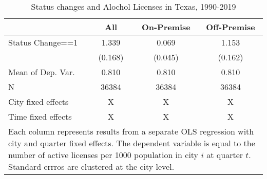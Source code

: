 \begin{table}
\centering
\caption{Status changes and Alochol Licenses in Texas, 1990-2019}
\centering
\begin{tabular}[t]{lccc}
\toprule
  & All & On-Premise & Off-Premise\\
\midrule
Status Change==1 & \num{1.339} & \num{0.069} & \num{1.153}\\
 & (\num{0.168}) & (\num{0.045}) & (\num{0.162})\\
\midrule
Mean of Dep. Var. & 0.810 & 0.810 & 0.810\\
N & \num{36384} & \num{36384} & \num{36384}\\
City fixed effects & X & X & X\\
Time fixed effects & X & X & X\\
\bottomrule
\multicolumn{4}{l}{\rule{0pt}{1em}Each column represents results from a separate OLS regression with city and quarter fixed effects. The dependent variable is equal to the number of active licenses per 1000 population in city $i$ at quarter $t$. Standard errros are clustered at the city level.}\\
\end{tabular}
\end{table}
